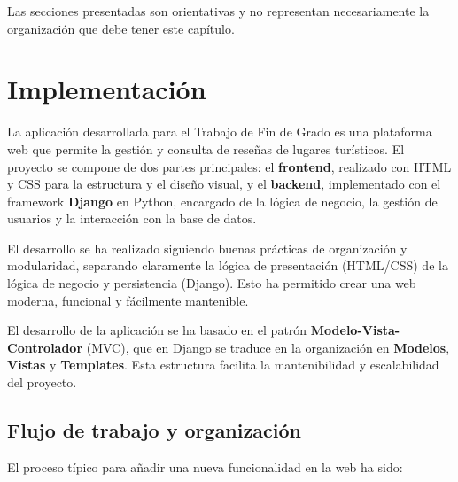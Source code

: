 Las secciones presentadas son orientativas y no representan
necesariamente la organización que debe tener este capítulo.
\section{Implementación}

La aplicación desarrollada para el Trabajo de Fin de Grado es una plataforma web que permite la gestión y consulta de reseñas de lugares turísticos. El proyecto se compone de dos partes principales: el \textbf{frontend}, realizado con HTML y CSS para la estructura y el diseño visual, y el \textbf{backend}, implementado con el framework \textbf{Django} en Python, encargado de la lógica de negocio, la gestión de usuarios y la interacción con la base de datos.

El desarrollo se ha realizado siguiendo buenas prácticas de organización y modularidad, separando claramente la lógica de presentación (HTML/CSS) de la lógica de negocio y persistencia (Django). Esto ha permitido crear una web moderna, funcional y fácilmente mantenible.

El desarrollo de la aplicación se ha basado en el patrón \textbf{Modelo-Vista-Controlador} (MVC), que en Django se traduce en la organización en \textbf{Modelos}, \textbf{Vistas} y \textbf{Templates}. Esta estructura facilita la mantenibilidad y escalabilidad del proyecto.

\subsection{Flujo de trabajo y organización}

El proceso típico para añadir una nueva funcionalidad en la web ha sido:

